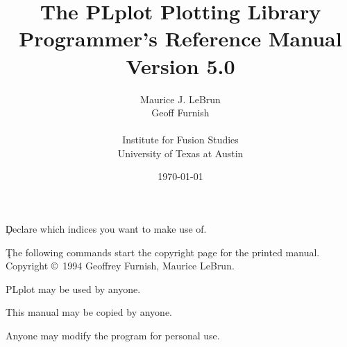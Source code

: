%
%
%
%
%
%
%
%
%
%

\pagestyle{headings}



\c Declare which indices you want to make use of.

\title{ The PLplot Plotting Library \\ 
        Programmer's Reference Manual \\
        Version 5.0}
\author{
        Maurice J. LeBrun\\
        Geoff Furnish\\
\\
        Institute for Fusion Studies\\
        University of Texas at Austin\\
        }

\date{\today}
\maketitle

\c The following commands start the copyright page for the printed manual.
\clearpage
\vspace{0pt plus 1filll}
Copyright \copyright\ 1994 Geoffrey Furnish, Maurice LeBrun.

PLplot may be used by anyone.

This manual may be copied by anyone.

Anyone may modify the program for personal use.

